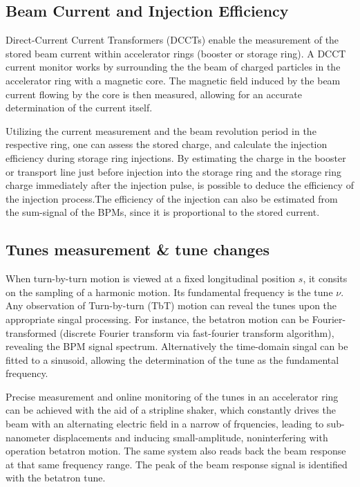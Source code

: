 \subsection{Beam Current and Injection Efficiency}
Direct-Current Current Transformers (DCCTs) enable the measurement of the stored beam current within accelerator rings (booster or storage ring). A DCCT current monitor works by surrounding the the beam of charged particles in the accelerator ring with a magnetic core. The magnetic field induced by the beam current flowing by the core is then measured, allowing for an accurate determination of the current itself.

 Utilizing the current measurement and the beam revolution period in the respective ring, one can assess the stored charge, and calculate the injection efficiency during storage ring injections. By estimating the charge in the booster or transport line just before injection into the storage ring and the storage ring charge immediately after the injection pulse, is possible to deduce the efficiency of the injection process.The efficiency of the injection can also be estimated from the sum-signal of the BPMs, since it is proportional to the stored current.

\subsection{Tunes measurement \& tune changes}
When turn-by-turn motion is viewed at a fixed longitudinal position $s$, it consits on the sampling of a harmonic motion. Its fundamental frequency is the tune $\nu$. Any observation of Turn-by-turn (TbT) motion can reveal the tunes upon the appropriate singal processing. For instance, the betatron motion can be Fourier-transformed (discrete Fourier transform via fast-fourier transform algorithm), revealing the BPM signal spectrum. Alternatively the time-domain singal can be fitted to a sinusoid, allowing the determination of the tune as the fundamental frequency.

Precise measurement and online monitoring of the tunes in an accelerator ring can be achieved with the aid of a stripline shaker, which constantly drives the beam with an alternating electric field in a narrow of frquencies, leading to sub-nanometer displacements and inducing small-amplitude, noninterfering with operation betatron motion. The same system also reads back the beam response at that same frequency range. The peak of the beam response signal is identified with the betatron tune.

